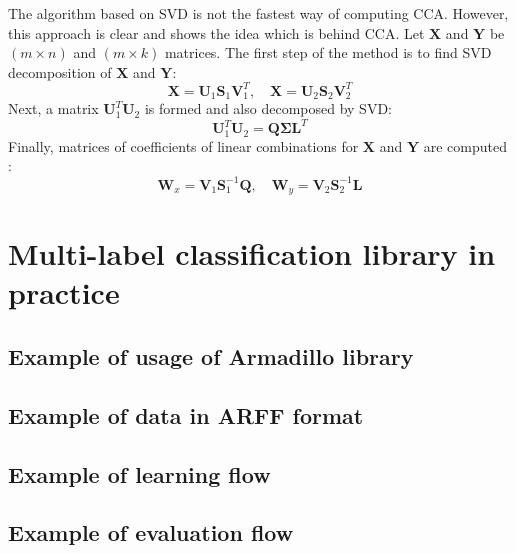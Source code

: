 \documentclass[english,a4paper,twoside]{ppfcmthesis}
\begin{document}
\begin{appendices}
The algorithm based on SVD is not the fastest way of computing CCA. However, this approach is clear and shows the idea which is behind CCA. Let $\boldsymbol{X}$ and $\boldsymbol{Y}$ be $(m \times n)$ and $(m \times k)$ matrices. The first step of the method is to find SVD decomposition of $\boldsymbol{X}$ and $\boldsymbol{Y}$:
\begin{equation}
    \boldsymbol{X}=\boldsymbol{U}_1\boldsymbol{S}_1\boldsymbol{V}^T_1, \quad \boldsymbol{X}=\boldsymbol{U}_2\boldsymbol{S}_2\boldsymbol{V}^T_2
\end{equation}
Next, a matrix $\boldsymbol{U}_1^T\boldsymbol{U}_2$ is formed and also decomposed by SVD:
\begin{equation}
    \boldsymbol{U}_1^T\boldsymbol{U}_2 = \boldsymbol{Q}\boldsymbol{\Sigma}{\boldsymbol{L}^T}
\end{equation}
Finally, matrices of coefficients of linear combinations for $\boldsymbol{X}$ and $\boldsymbol{Y}$ are computed \citep{William}:
\begin{equation}
    \boldsymbol{W}_x=\boldsymbol{V}_1\boldsymbol{S}_1^{-1}\boldsymbol{Q}, \quad  \boldsymbol{W}_y=\boldsymbol{V}_2\boldsymbol{S}_2^{-1}\boldsymbol{L}
\end{equation}


\chapter{Multi-label classification library in practice}
\section{Example of usage of Armadillo library}
\label{app:arma}


\newpage
\section{Example of data in ARFF format}
\label{app:arff}



\newpage
\section{Example of learning flow}
\label{app:learning}


\newpage
\section{Example of evaluation flow}
\label{app:evaluating}


\end{appendices}


{}

\ppcolophon
\end{document}
